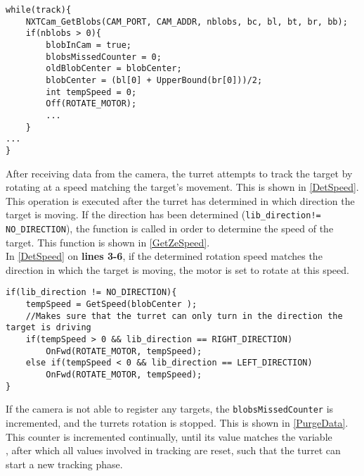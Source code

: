 \begin{minipage}[H]{\linewidth}
\begin{lstlisting}[caption = First part of the general tracking behaviour., label = TrackFirst]
 while(track){
	NXTCam_GetBlobs(CAM_PORT, CAM_ADDR, nblobs, bc, bl, bt, br, bb);
    if(nblobs > 0){
    	blobInCam = true;
        blobsMissedCounter = 0;
        oldBlobCenter = blobCenter;
        blobCenter = (bl[0] + UpperBound(br[0]))/2;
        int tempSpeed = 0;
        Off(ROTATE_MOTOR);
        ...
	}
...
}          
\end{lstlisting}
\end{minipage}

After receiving data from the camera, the turret attempts to track the target by
rotating at a speed matching the target's movement. This is shown in
\autoref{DetSpeed}. This operation is executed after the turret has
determined in which direction the target is moving. If the direction has
been determined (\texttt{lib\_direction!= NO\_DIRECTION}), the
 function is called in order to determine the speed of the
target. This function is shown in \autoref{GetZeSpeed}.\\
In \autoref{DetSpeed} on \textbf{lines 3-6}, if the determined rotation speed
matches the direction in which the target is moving, the motor is set to rotate at this speed.\nl

\begin{minipage}[H]{\linewidth}
\begin{lstlisting}[caption = Determine the targets speed at rotate to match it, label = DetSpeed] 
if(lib_direction != NO_DIRECTION){
	tempSpeed = GetSpeed(blobCenter );
    //Makes sure that the turret can only turn in the direction the target is driving
    if(tempSpeed > 0 && lib_direction == RIGHT_DIRECTION)
    	OnFwd(ROTATE_MOTOR, tempSpeed);
    else if(tempSpeed < 0 && lib_direction == LEFT_DIRECTION)
    	OnFwd(ROTATE_MOTOR, tempSpeed);
}
\end{lstlisting}
\end{minipage}

If the camera is not able to register any targets, the
\texttt{blobsMissedCounter} is incremented, and the turrets rotation is stopped.
This is shown in \autoref{PurgeData}. This counter is incremented continually, until its value
matches the variable \\
, after which all
values involved in tracking are reset, such that the turret can start a new
tracking phase.\nl

